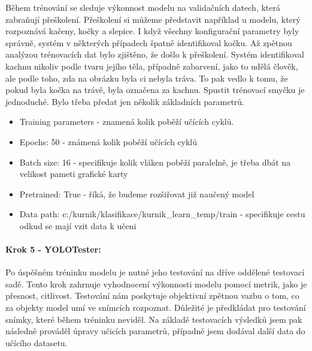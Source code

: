 Během trénování se sleduje výkonnost modelu na validačních datech, která zabraňují přeškolení.
Přeškolení si můžeme představit například u modelu, který rozpoznává kačeny, kočky a slepice.
I když všechny konfigurační parametry byly správně,  systém v některých případech špatně identifikoval kočku.
Až zpětnou analýzou trénovacích dat bylo zjištěno, že došlo k přeškolení.
Systém identifikoval kachnu nikoliv podle tvaru jejího těla, případně zabarvení, jako to udělá člověk, ale podle toho, zda na obrázku byla ci nebyla tráva.
To pak vedlo k tomu, že pokud byla kočka na trávě, byla označena za kachnu.
Spustit trénovací smyčku je jednoduché.
Bylo třeba předat jen několik základních parametrů.


\begin{itemize}
    \item[] Training parameters - znamená kolik poběží učících cyklů.
    \item[] Epochs: 50 - známená kolik poběží učících cyklů
    \item[] Batch size: 16 - specifikuje kolik vláken poběží paralelně, je třeba dbát na velikost pameti grafické karty
    \item[] Pretrained: True - říká, že budeme rozšiřovat již naučený model
    \item[] Data path: c:/kurnik/klasifikace/kurnik\_learn\_temp/train - specifikuje cestu odkud se mají vzit data k učeni
\end{itemize}

\paragraph*{Krok 5 - YOLOTester:}

Po úspěšném tréninku modelu je nutné jeho testování na dříve oddělené testovací sadě.
Tento krok zahrnuje vyhodnocení výkonnosti modelu pomocí metrik, jako je přesnost, citlivost.
Testování nám poskytuje objektivní zpětnou vazbu o tom, co za objekty model umí ve snímcích rozpoznat.
Důležité je předkládat pro testování snímky, které během tréninku neviděl.
Na základě testovacích výsledků jsem pak následně prováděl úpravy učicích parametrů, případně jsem dodával další data do učícího datasetu.

